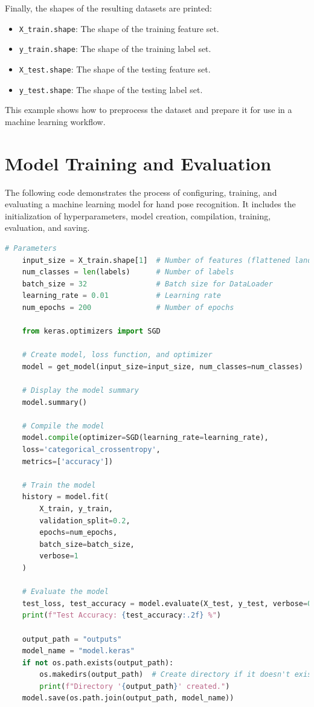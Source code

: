 Finally, the shapes of the resulting datasets are printed:
\begin{itemize}
	\item \texttt{X\_train.shape}: The shape of the training feature set.
	\item \texttt{y\_train.shape}: The shape of the training label set.
	\item \texttt{X\_test.shape}: The shape of the testing feature set.
	\item \texttt{y\_test.shape}: The shape of the testing label set.
\end{itemize}

This example shows how to preprocess the dataset and prepare it for use in a machine learning workflow.

\section{Model Training and Evaluation}

The following code demonstrates the process of configuring, training, and evaluating a machine learning model for hand pose recognition. It includes the initialization of hyperparameters, model creation, compilation, training, evaluation, and saving.

\begin{lstlisting}[language=Python, caption=Model Training and Evaluation]
	# Parameters
	input_size = X_train.shape[1]  # Number of features (flattened landmarks)
	num_classes = len(labels)      # Number of labels
	batch_size = 32                # Batch size for DataLoader
	learning_rate = 0.01           # Learning rate
	num_epochs = 200               # Number of epochs
	
	from keras.optimizers import SGD
	
	# Create model, loss function, and optimizer
	model = get_model(input_size=input_size, num_classes=num_classes)
	
	# Display the model summary
	model.summary()
	
	# Compile the model
	model.compile(optimizer=SGD(learning_rate=learning_rate),
	loss='categorical_crossentropy',
	metrics=['accuracy'])
	
	# Train the model
	history = model.fit(
		X_train, y_train,
		validation_split=0.2,
		epochs=num_epochs,
		batch_size=batch_size,
		verbose=1
	)
	
	# Evaluate the model
	test_loss, test_accuracy = model.evaluate(X_test, y_test, verbose=0)
	print(f"Test Accuracy: {test_accuracy:.2f} %")
	
	output_path = "outputs"
	model_name = "model.keras"
	if not os.path.exists(output_path):
		os.makedirs(output_path)  # Create directory if it doesn't exist
		print(f"Directory '{output_path}' created.")
	model.save(os.path.join(output_path, model_name))
\end{lstlisting}


